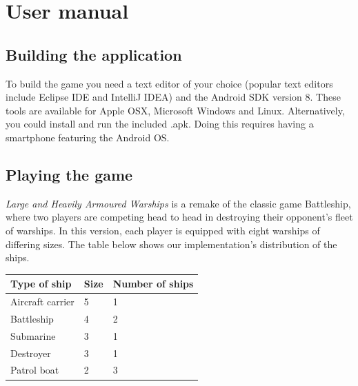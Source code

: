 \chapter{User manual}

\section{Building the application}

To build the game you need a text editor of your choice (popular text editors include Eclipse IDE and IntelliJ IDEA) and the Android SDK version 8. These tools are available for Apple OSX, Microsoft Windows and Linux.
Alternatively, you could install and run the included .apk. Doing this requires having a smartphone featuring the Android OS.


\section{Playing the game}

\emph{Large and Heavily Armoured Warships} is a remake of the classic game Battleship, where two players are competing head to head in destroying their opponent's fleet of warships. In this version, each player is equipped with eight warships of differing sizes. The table below shows our implementation's distribution of the ships.

\vspace{0.5em}
\noindent
\begin{tabular}{|l|l|l|}
	\hline
	\rowcolor[gray]{0.8}
	\bf{Type of ship} 	& \bf{Size} & \bf{Number of ships} \\
	\hline
	
	Aircraft carrier	& 5		& 1 \\
	Battleship 			& 4		& 2 \\
	Submarine			& 3		& 1 \\
	Destroyer			& 3		& 1 \\
	Patrol boat			& 2		& 3 \\
	\hline
\end{tabular}
\newpage

